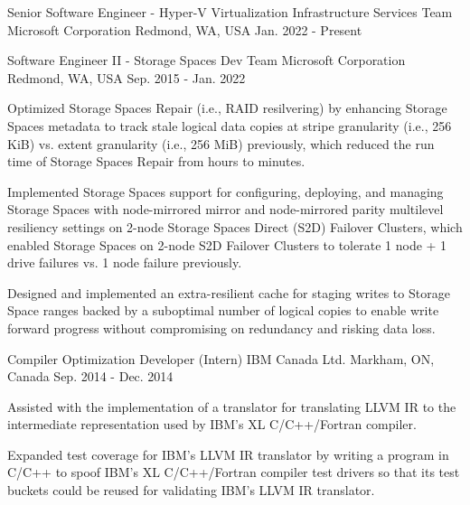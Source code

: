 

\begin{cventries}

  \cventry
    {Senior Software Engineer - Hyper-V Virtualization Infrastructure Services Team} %
    {Microsoft Corporation} %
    {Redmond, WA, USA} %
    {Jan. 2022 - Present} %
    {
    }

  \cventry
    {Software Engineer II - Storage Spaces Dev Team} %
    {Microsoft Corporation} %
    {Redmond, WA, USA} %
    {Sep. 2015 - Jan. 2022} %
    {
      \begin{cvitems} %
        \item {
          Optimized Storage Spaces Repair (i.e., RAID resilvering) by enhancing Storage
          Spaces metadata to track stale logical data copies at stripe granularity
          (i.e., 256 KiB) vs. extent granularity (i.e., 256 MiB) previously, which
          reduced the run time of Storage Spaces Repair from hours to minutes.
        }
        \item {
          Implemented Storage Spaces support for configuring, deploying, and managing
          Storage Spaces with node-mirrored mirror and node-mirrored parity multilevel
          resiliency settings on 2-node Storage Spaces Direct (S2D) Failover Clusters,
          which enabled Storage Spaces on 2-node S2D Failover Clusters to tolerate 1
          node + 1 drive failures vs. 1 node failure previously.
        }
        \item {
          Designed and implemented an extra-resilient cache for staging writes to
          Storage Space ranges backed by a suboptimal number of logical copies to
          enable write forward progress without compromising on redundancy and risking
          data loss.
        }
      \end{cvitems}
    }

  \cventry
    {Compiler Optimization Developer (Intern)} %
    {IBM Canada Ltd.} %
    {Markham, ON, Canada} %
    {Sep. 2014 - Dec. 2014} %
    {
      \begin{cvitems} %
        \item {
          Assisted with the implementation of a translator for translating LLVM IR to
          the intermediate representation used by IBM's XL C/C++/Fortran compiler.
        }
        \item {
          Expanded test coverage for IBM's LLVM IR translator by writing a program in
          C/C++ to spoof IBM's XL C/C++/Fortran compiler test drivers so that its test
          buckets could be reused for validating IBM's LLVM IR translator.
        }
      \end{cvitems}
    }


\end{cventries}
